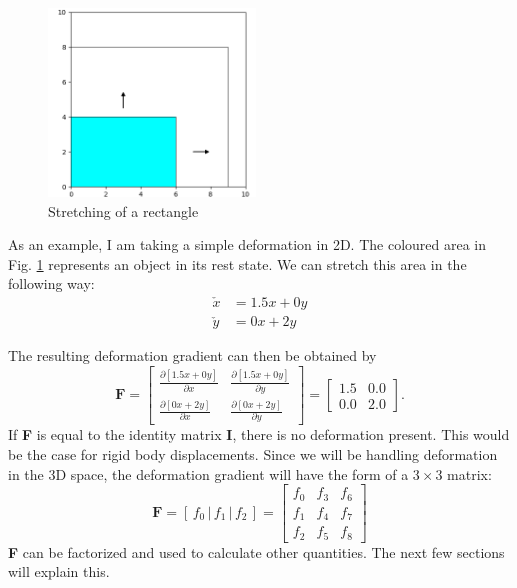 \begin{figure}
\centering
	\includegraphics[width=5.5cm]{resources/stretch_plot.png}
	\caption[Stretching of a rectangle]{Stretching of a rectangle}
	\label{stretch:1}
\end{figure}
As an example, I am taking a simple deformation in 2D. The coloured area in Fig. \ref{stretch:1} represents an object in its rest state. We can stretch this area in the following way:
\begin{align*}
	\check{x} &= 1.5x + 0y		\\
	\check{y} &= 0x + 2y	
\end{align*}

The resulting deformation gradient can then be obtained by
\[
	\mathbf{F} = \begin{bmatrix} \frac{\partial [1.5x + 0y]}{\partial x} & \frac{\partial [1.5x + 0y]}{\partial y} \\ \frac{\partial [0x + 2y]}{\partial x} & \frac{\partial [0x + 2y]}{\partial y} \end{bmatrix} = \begin{bmatrix} 1.5 & 0.0 \\ 0.0 & 2.0 \end{bmatrix}.
\]
If \textbf{F} is equal to the identity matrix \textbf{I}, there is no deformation present. This would be the case for rigid body displacements. Since we will be handling deformation in the 3D space, the deformation gradient will have the form of a $3 \times 3$ matrix:
\begin{equation}\label{eq:deformation_gradient}
\textbf{F} = \left[ \,f_0\, \bigg| \,f_1\, \bigg| \,f_2\, \right] = \begin{bmatrix} f_0 & f_3 & f_6 \\ f_1 & f_4 & f_7 \\ f_2 & f_5 & f_8 \end{bmatrix}
\end{equation}
\textbf{F} can be factorized and used to calculate other quantities. The next few sections will explain this.


